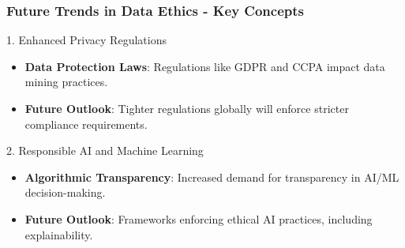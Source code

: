 \documentclass[aspectratio=169]{beamer}
\begin{document}
\begin{frame}[fragile]
    \frametitle{Future Trends in Data Ethics - Key Concepts}
    \begin{block}{1. Enhanced Privacy Regulations}
        \begin{itemize}
            \item \textbf{Data Protection Laws}: Regulations like GDPR and CCPA impact data mining practices.
            \item \textbf{Future Outlook}: Tighter regulations globally will enforce stricter compliance requirements.
        \end{itemize}
    \end{block}
    
    \begin{block}{2. Responsible AI and Machine Learning}
        \begin{itemize}
            \item \textbf{Algorithmic Transparency}: Increased demand for transparency in AI/ML decision-making.
            \item \textbf{Future Outlook}: Frameworks enforcing ethical AI practices, including explainability.
        \end{itemize}
    \end{block}
\end{frame}
\end{document}
